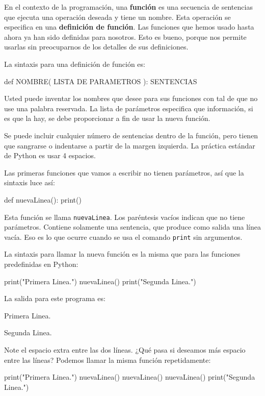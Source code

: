 En el contexto de la programación, una \textbf{función} es una secuencia
de sentencias que ejecuta una operación deseada y tiene un nombre.
Esta operación se especifica en una \textbf{definición de función}.
Las funciones que hemos usado hasta ahora ya han sido definidas para
nosotros. Esto es bueno, porque nos permite usarlas sin preocuparnos
de los detalles de sus definiciones.

  

La sintaxis para una definición de función es:

\begin{pythoncode}
def NOMBRE( LISTA DE PARAMETROS ):
  SENTENCIAS
\end{pythoncode}
 Usted puede inventar los nombres que desee para sus funciones con
tal de que no use una palabra reservada. La lista de parámetros especifica
que información, si es que la hay, se debe proporcionar a fin de usar
la nueva función.

Se puede incluir cualquier número de sentencias dentro de la función,
pero tienen que sangrarse o indentarse a partir de la margen izquierda.
La práctica estándar de Python es usar 4 espacios.

Las primeras funciones que vamos a escribir no tienen parámetros,
así que la sintaxis luce así:

\begin{pythoncode}
def nuevaLinea():
  print()
\end{pythoncode}
 Esta función se llama \texttt{nuevaLinea}. Los paréntesis vacíos
indican que no tiene parámetros. Contiene solamente una sentencia,
que produce como salida una línea vacía. Eso es lo que ocurre cuando
se usa el comando \texttt{print} sin argumentos.

La sintaxis para llamar la nueva función es la misma que para las
funciones predefinidas en Python:

\begin{pythoncode}
print("Primera Linea.")
nuevaLinea()
print("Segunda Linea.")
\end{pythoncode}
 La salida para este programa es:
\begin{pythoncode}
Primera Linea.

Segunda Linea.
\end{pythoncode}
Note el espacio extra entre las dos líneas. ¿Qué pasa si deseamos
más espacio entre las líneas? Podemos llamar la misma función repetidamente:

\begin{pythoncode}
print("Primera Linea.")
nuevaLinea()
nuevaLinea()
nuevaLinea()
print("Segunda Linea.")
\end{pythoncode}
 

